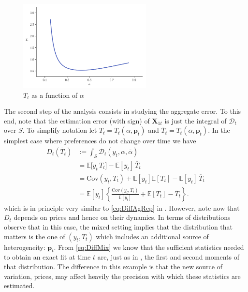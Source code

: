 \documentclass[english, a4paper, 12pt]{article}
\begin{document}
	\begin{figure}
		\caption{$T_{t}$ as a function of $\alpha$}
		\label{fig:monotTt}
		\includegraphics[width = 0.6\textwidth]{MonotonocityTt}
		\vspace{-2ex}
	\end{figure}
The second step of the analysis consists in studying the aggregate error. To this end, note that the estimation error (with sign) of $\mathbf{X}_{1t}$ is just the integral of $\mathcal{D}_{t}$ over $S$. To simplify notation let $T_{t} = T_{t}(\alpha , \mathbf{p}_{t})$ and $\overline{T}_{t} = T_{t}(\overline{\alpha}, \mathbf{p}_{t})$. In the simplest case where preferences do not change over time we have
	\begin{equation} \label{eq:DiffMix}
	\begin{aligned} 
		D_{t}\left(\overline{T}_{t}\right)
			&:=	\int_{S} \mathcal{D}_{t}(y_{t},\alpha,\overline{\alpha})	\\
			&=	\mathbb{E}\big[y_{t} \, T_{t}\big] - \mathbb{E}[y_{t}]\, \overline{T}_{t}		\\
			&=	\mathrm{Cov}\left(y_{t}, T_{t} \right) + \mathbb{E}[y_{t}]\mathbb{E}\left[T_{t}\right] - \mathbb{E}[y_{t}]\, \overline{T}_{t}	\\
			&= 	\mathbb{E}[y_{t}]\left\{ \frac{\mathrm{Cov}\left(y_{t}, T_{t} \right)}{\mathbb{E}[y_{t}]} + \mathbb{E}\left[T_{t}\right] - \overline{T}_{t} \right\}.
	\end{aligned}
	\end{equation}
which is in principle very similar to \eqref{eq:DiffAgRep} in . However, note now that $D_{t}$ depends on prices and hence on their dynamics. In terms of distributions observe that in this case, the mixed setting implies that the distribution that matters is the one of $(y_{t},T_{t})$ which includes an additional source of heterogeneity: $\mathbf{p}_{t}$. From \eqref{eq:DiffMix} we know that the sufficient statistics needed to obtain an exact fit at time $t$ are, just as in , the first and second moments of that distribution. The difference in this example is that the new source of variation, prices, may affect heavily the precision with which these statistics are estimated.
\end{document}
